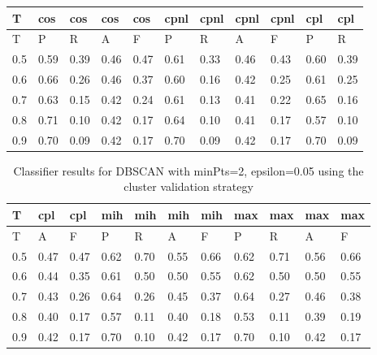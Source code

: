 \begin{center}
\begin{table}[!h]
\centering
\begin{tabular}{|l|l|l|l|l|l|l|l|l|l|l|}
  \hline
T & cos & cos & cos & cos & cpnl & cpnl & cpnl & cpnl & cpl & cpl \\ 
  \hline
T & P & R & A & F & P & R & A & F & P & R \\ 
   \hline
0.5 & 0.59 & 0.39 & 0.46 & 0.47 & 0.61 & 0.33 & 0.46 & 0.43 & 0.60 & 0.39 \\ 
  0.6 & 0.66 & 0.26 & 0.46 & 0.37 & 0.60 & 0.16 & 0.42 & 0.25 & 0.61 & 0.25 \\ 
  0.7 & 0.63 & 0.15 & 0.42 & 0.24 & 0.61 & 0.13 & 0.41 & 0.22 & 0.65 & 0.16 \\ 
  0.8 & 0.71 & 0.10 & 0.42 & 0.17 & 0.64 & 0.10 & 0.41 & 0.17 & 0.57 & 0.10 \\ 
  0.9 & 0.70 & 0.09 & 0.42 & 0.17 & 0.70 & 0.09 & 0.42 & 0.17 & 0.70 & 0.09 \\ 
   \hline
\end{tabular}
\end{table}
\begin{table}[!h]
\centering
\begin{tabular}{|l|l|l|l|l|l|l|l|l|l|l|}
  \hline
T & cpl & cpl & mih & mih & mih & mih & max & max & max & max \\ 
  \hline
T & A & F & P & R & A & F & P & R & A & F \\ 
   \hline
0.5 & 0.47 & 0.47 & 0.62 & 0.70 & 0.55 & 0.66 & 0.62 & 0.71 & 0.56 & 0.66 \\ 
  0.6 & 0.44 & 0.35 & 0.61 & 0.50 & 0.50 & 0.55 & 0.62 & 0.50 & 0.50 & 0.55 \\ 
  0.7 & 0.43 & 0.26 & 0.64 & 0.26 & 0.45 & 0.37 & 0.64 & 0.27 & 0.46 & 0.38 \\ 
  0.8 & 0.40 & 0.17 & 0.57 & 0.11 & 0.40 & 0.18 & 0.53 & 0.11 & 0.39 & 0.19 \\ 
  0.9 & 0.42 & 0.17 & 0.70 & 0.10 & 0.42 & 0.17 & 0.70 & 0.10 & 0.42 & 0.17 \\ 
   \hline
\end{tabular}
\caption{Classifier results for DBSCAN with minPts=2, epsilon=0.05 using the cluster validation strategy} 
\label{}
\end{table}\end{center}
